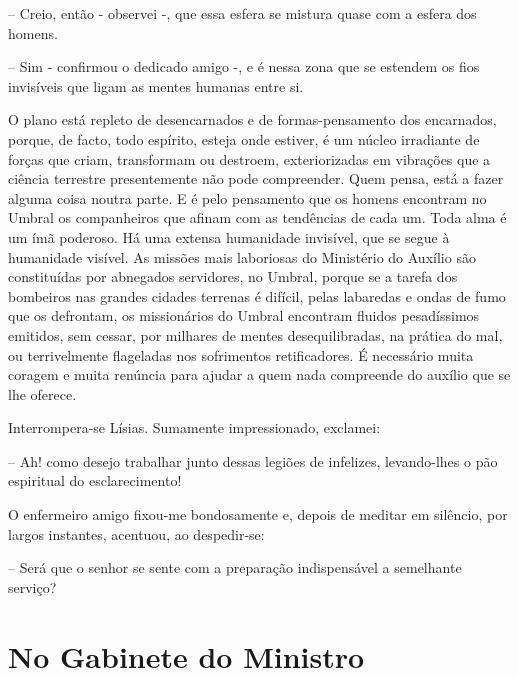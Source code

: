 \documentclass[portuguese,12pt,a4paper]{scrbook}
\begin{document}
	
	– Creio, então - observei -, que essa esfera se mistura quase com a esfera dos homens.
	
	– Sim - confirmou o dedicado amigo -, e é nessa zona que se estendem os fios invisíveis que ligam as mentes humanas entre si.
	
	O plano está repleto de desencarnados e de formas-pensamento dos encarnados, porque, de facto, todo espírito, esteja onde estiver, é um núcleo irradiante de forças que criam, transformam ou destroem, exteriorizadas em vibrações que a ciência terrestre presentemente não pode compreender. Quem pensa, está a fazer alguma coisa noutra parte. E é pelo pensamento que os homens encontram no Umbral os companheiros que afinam com as tendências de cada um. Toda alma é um ímã poderoso. Há uma extensa humanidade invisível, que se segue à humanidade visível. As missões mais laboriosas do Ministério do Auxílio são constituídas por abnegados servidores, no Umbral, porque se a tarefa dos bombeiros nas grandes cidades terrenas é difícil, pelas labaredas e ondas de fumo que os defrontam, os missionários do Umbral encontram fluidos pesadíssimos emitidos, sem cessar, por milhares de mentes desequilibradas, na prática do mal, ou terrivelmente flageladas nos sofrimentos retificadores. É necessário muita coragem e muita renúncia para ajudar a quem nada compreende do auxílio que se lhe oferece.
	
	Interrompera-se Lísias. Sumamente impressionado, exclamei:
	
	– Ah! como desejo trabalhar junto dessas legiões de infelizes, levando-lhes o pão espiritual do esclarecimento!
	
	O enfermeiro amigo fixou-me bondosamente e, depois de meditar em silêncio, por largos instantes, acentuou, ao despedir-se:
	
	– Será que o senhor se sente com a preparação indispensável a semelhante serviço?
	
	
	\chapter{No Gabinete do Ministro}
	
\end{document}
